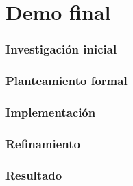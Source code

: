 \chapter{Demo final}

\subsection{Investigación inicial}
\subsection{Planteamiento formal}
\subsection{Implementación}
\subsection{Refinamiento}
\subsection{Resultado}